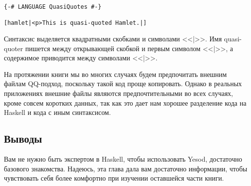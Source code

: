 \begin{lstlisting}
{-# LANGUAGE QuasiQuotes #-}

[hamlet|<p>This is quasi-quoted Hamlet.|]
\end{lstlisting}

Синтаксис выделяется квадратными скобками и символами <<|>>. Имя quasi-quoter пишется между открывающей скобкой и первым символом <<|>>, а содержимое приводится между символами <<|>>.

На протяжении книги мы во многих случаях будем предпочитать внешним файлам QQ-подход, поскольку такой код проще копировать. Однако в реальных приложениях внешние файлы являются предпочтительными во всех случаях, кроме совсем коротких данных, так как это дает нам хорошее разделение кода на Haskell и кода с иным синтаксисом.

\subsection{Выводы}

Вам не нужно быть экспертом в Haskell, чтобы использовать Yesod, достаточно базового знакомства. Надеюсь, эта глава дала вам достаточно информации, чтобы чувствовать себя более комфортно при изучении оставшейся части книги.
